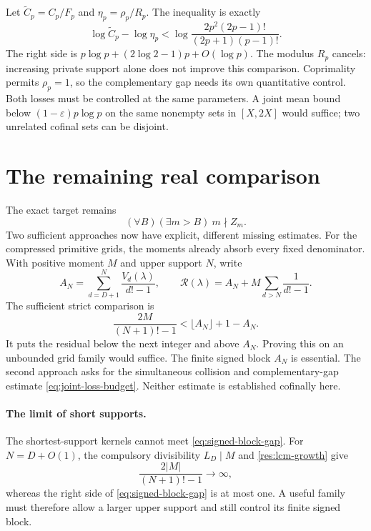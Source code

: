 \documentclass[11pt]{article}
\begin{document}
Let $\widetilde C_p=C_p/F_p$ and $\eta_p=\rho_p/R_p$.  The inequality is
exactly
\begin{equation}
\log\widetilde C_p-\log\eta_p
<\log\frac{2p^2(2p-1)!}{(2p+1)(p-1)!}.
\label{eq:joint-loss-budget}
\end{equation}
The right side is $p\log p+(2\log2-1)p+O(\log p)$.
The modulus $R_p$ cancels: increasing private support alone does not improve
this comparison.  Coprimality permits $\rho_p=1$, so the complementary gap
needs its own quantitative control.  Both losses must be controlled at the
same parameters.  A joint mean bound below $(1-\varepsilon)p\log p$ on the
same nonempty sets in $[X,2X]$ would suffice; two unrelated cofinal sets can
be disjoint.

\section{The remaining real comparison}\label{sec:open}\label{sec:plateau}

The exact target remains
\begin{equation}
(\forall B)(\exists m>B)\ m\nmid Z_m.
\label{eq:canonical-open-target}
\end{equation}
Two sufficient approaches now have explicit, different missing estimates.
For the compressed primitive grids, the moments already absorb every fixed
denominator.  With positive moment $M$ and upper support $N$, write
\[
A_N=\sum_{d=D+1}^N\frac{V_d(\lambda)}{d!-1},\qquad
\mathcal R(\lambda)=A_N+M\sum_{d>N}\frac1{d!-1}.
\]
The sufficient strict comparison is
\begin{equation}
\frac{2M}{(N+1)!-1}<\lfloor A_N\rfloor+1-A_N.
\label{eq:signed-block-gap}
\end{equation}
It puts the residual below the next integer and above $A_N$.  Proving this
on an unbounded grid family would suffice.  The finite signed block $A_N$
is essential.  The second approach asks for the simultaneous collision and
complementary-gap estimate \eqref{eq:joint-loss-budget}.
Neither estimate is established cofinally here.

\paragraph{The limit of short supports.}
\label{sec:nogo}\label{sec:adjacent-unit-no-go}
The shortest-support kernels cannot meet \eqref{eq:signed-block-gap}.
For $N=D+O(1)$, the compulsory divisibility $L_D\mid M$ and
\eqref{res:lcm-growth} give
\[
\frac{2|M|}{(N+1)!-1}\longrightarrow\infty,
\]
whereas the right side of \eqref{eq:signed-block-gap} is at most one.
A useful family must therefore allow a larger upper support and still
control its finite signed block.
\end{document}
